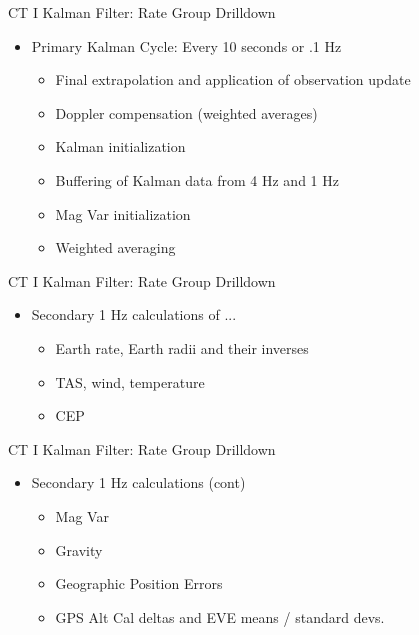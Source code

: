 \begin{frame}
CT I Kalman Filter: Rate Group Drilldown
\begin{itemize}
   \item Primary Kalman Cycle: Every 10 seconds or .1 Hz
	\begin{itemize}
		\item Final extrapolation and application of observation update
	 	\item Doppler compensation (weighted averages)
		\item Kalman initialization
		\item Buffering of Kalman data from 4 Hz and 1 Hz
		\item Mag Var initialization
		\item Weighted averaging
	\end{itemize}
\end{itemize} 
\end{frame}


\begin{frame}
CT I Kalman Filter: Rate Group Drilldown
\begin{itemize}
  \item Secondary 1 Hz calculations of ...
  \begin{itemize}
	\item Earth rate, Earth radii and their inverses
	\item TAS, wind, temperature
    \item CEP
  \end{itemize}
\end{itemize} 
\end{frame}

\begin{frame}
CT I Kalman Filter: Rate Group Drilldown
\begin{itemize}
  \item Secondary 1 Hz calculations (cont)
  \begin{itemize}
	\item Mag Var
	\item Gravity
    \item Geographic Position Errors
  	\item GPS Alt Cal deltas and EVE means / standard devs.
  \end{itemize}
\end{itemize} 
\end{frame}

